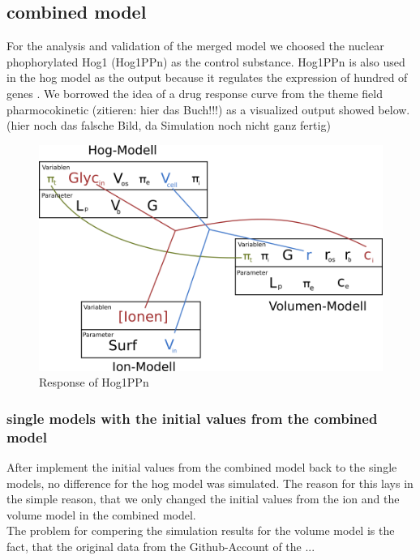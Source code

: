 \subsection{combined model}
For the analysis and validation of the merged model we choosed the nuclear phophorylated Hog1 (Hog1PPn) as the control substance. Hog1PPn is also used in the hog model as the output because it regulates the expression of hundred of genes \cite{Zi_2010}. We borrowed the idea of a drug response curve from the theme field pharmocokinetic (zitieren: hier das Buch!!!) as a visualized output showed below.  \\
(hier noch das falsche Bild, da Simulation noch nicht ganz fertig)
\begin{figure}[h!]
	\begin{center}
		\begin{minipage}{0,8\textwidth}
			
			\includegraphics[width=\textwidth]{picture/model_intersections.png}
			\caption{Response of Hog1PPn} 
			\label{DrugResponseCurve} 
		\end{minipage}
	\end{center}
\end{figure}

\subsubsection{single models with the initial values from the combined model}
After implement the initial values from the combined model back to the single models, no difference for the hog model was simulated. The reason for this lays in the simple reason, that we only changed the initial values from the ion and the volume model in the combined model.\\
The problem for compering the simulation results for the volume model is the fact, that the original data from the Github-Account of the ...

\newpage

